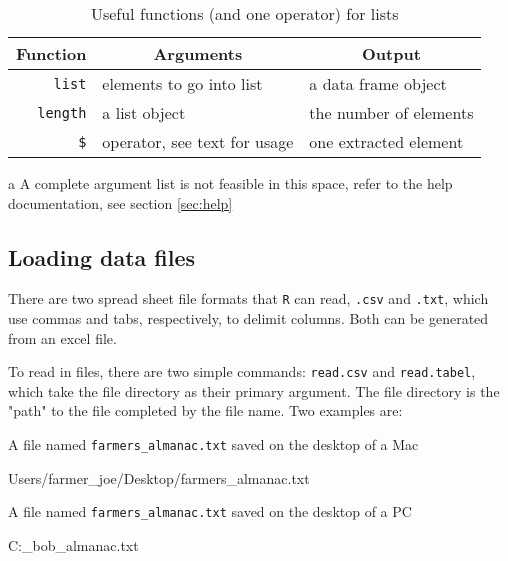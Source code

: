 \documentclass[12pt]{article}
\newenvironment{verbatim}{ 
	\indent
	\begin{list}{}{\setlength{\itemsep}{-1.5mm}}
}{
	\end{list}
}
\begin{document}
\begin{table}[!htb]
	\begin{threeparttable}
	\caption{Useful functions (and one operator) for lists}
	\begin{tabular}{r l l}
		\hline
		Function 	&	\multicolumn{1}{c}{Arguments\tnote{a}}	&	\multicolumn{1}{c}{Output}		\\
		\hline
		\verb+list+		&	elements to go into list			&	a data frame object				\\
		\verb+length+	&	a list object					&	the number of elements			\\
		\verb+$+		&	operator, see text for usage		&	one extracted element			\\
		\hline
	\end{tabular}
	\begin{tablenotes}
		\item[a] A complete argument list is not feasible in this space, refer to the help documentation, see section \ref{sec:help}
	\end{tablenotes}
	\end{threeparttable}
\end{table}

\subsection{Loading data files}		\label{sec:reading}
There are two spread sheet file formats that \verb+R+ can read, \verb+.csv+ and \verb+.txt+, which use commas and tabs, respectively, to delimit columns. Both can be generated from an excel file.

To read in files, there are two simple commands: \verb+read.csv+ and \verb+read.tabel+, which take the file directory as their primary argument. The file directory is the "path" to the file completed by the file name.  Two examples are:

A file named \verb+farmers_almanac.txt+ saved on the desktop of a Mac
\begin{verbatim}
	Users/farmer_joe/Desktop/farmers_almanac.txt
\end{verbatim}

A file named \verb+farmers_almanac.txt+ saved on the desktop of a PC
\begin{verbatim}
	C:\Users\farmer_bob\Desktop\farmers_almanac.txt
\end{verbatim}
\end{document}
